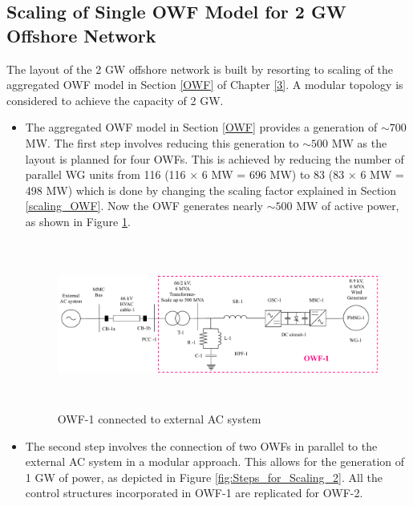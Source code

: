 \subsection{Scaling of Single OWF Model for 2 GW Offshore Network}\label{scaling_2GW}

The layout of the 2 GW offshore network is built by resorting to scaling of the aggregated \gls{OWF} model in Section \ref{OWF} of Chapter \ref{3}. A modular topology is considered to achieve the capacity of 2 GW. 

\begin{itemize}
    \item The aggregated \gls{OWF} model in Section \ref{OWF} provides a generation of $\sim{700}$ MW. The first step involves reducing this generation to $\sim{500}$ MW as the layout is planned for four \gls{OWF}s. This is achieved by reducing the number of parallel \gls{WG} units from 116 (116 $\times$ 6 MW = 696 MW) to 83 (83 $\times$ 6 MW = 498 MW) which is done by changing the scaling factor explained in Section \ref{scaling_OWF}. Now the \gls{OWF} generates nearly $\sim{500}$ MW of active power, as shown in Figure \ref{fig:Steps_for_Scaling_1}.
    
    \begin{figure}[H]
    \includegraphics[height = 5.5cm,width = \textwidth]{Diagrams/Chapter_4/Steps_for_Scaling_1.pdf}
    \caption{OWF-1 connected to external AC system}
    \label{fig:Steps_for_Scaling_1}
\end{figure}
    
    \item The second step involves the connection of two \gls{OWF}s in parallel to the external \gls{AC} system in a modular approach. This allows for the generation of 1 GW of power, as depicted in Figure \ref{fig:Steps_for_Scaling_2}. All the control structures incorporated in \gls{OWF}-1 are replicated for \gls{OWF}-2.
    

\end{itemize}
